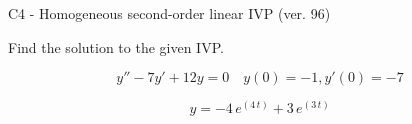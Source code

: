 \begin{exercise}
  \begin{exerciseTitle}C4 - Homogeneous second-order linear IVP (ver. 96)\end{exerciseTitle}
  \begin{exerciseStatement}
    
Find the solution to the given IVP.

    
\[y''-7y'+12y = 0 \hspace{1em} y(0) = -1 , y'(0) = -7\]

  \end{exerciseStatement}
  \begin{exerciseAnswer}
    
\[y= -4 \, e^{\left(4 \, t\right)} + 3 \, e^{\left(3 \, t\right)}\]

  \end{exerciseAnswer}
\end{exercise}